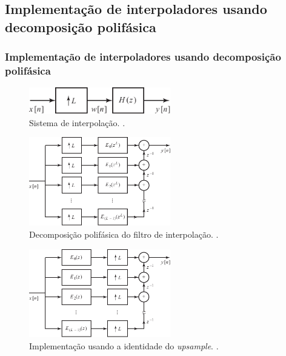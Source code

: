 \subsection{Implementação de interpoladores usando decomposição polifásica}
\begin{frame}[allowframebreaks]
  \frametitle{Implementação de interpoladores usando decomposição polifásica}

        \begin{figure}[h!]
        \centering
        \includegraphics[width=0.55\textwidth]{images/fig441.pdf}
        \caption{Sistema de interpolação. \citep{oppenheim2009}.}
        \label{fig:fig441}
        \end{figure}

        \begin{figure}[h!]
        \centering
        \includegraphics[width=0.55\textwidth]{images/fig442.pdf}
        \caption{Decomposição polifásica do filtro de interpolação. \citep{oppenheim2009}.}
        \label{fig:fig442}
        \end{figure}

        \begin{figure}[h!]
        \centering
        \includegraphics[width=0.55\textwidth]{images/fig443.pdf}
        \caption{Implementação usando a identidade do \textit{upsample}. \citep{oppenheim2009}.}
        \label{fig:fig443}
        \end{figure}

\end{frame}

